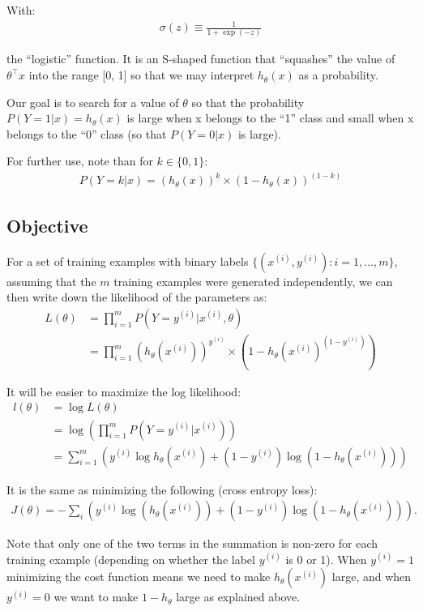 With:
\begin{align}
	\sigma(z) \equiv \frac{1}{1 + \exp(-z)}
\end{align}

the “logistic” function. It is an S-shaped function that “squashes” the value of $\theta^\top x$ into the range [0, 1] so that we may interpret $h_\theta(x)$ as a probability. 

Our goal is to search for a value of $\theta$ so that the probability $P(Y=1|x) = h_\theta(x)$ is large when x belongs to the “1” class and small when x belongs to the “0” class (so that $P(Y=0|x)$ is large). 

For further use, note than for $k \in \{0,1\}$:
\begin{align}
	P(Y=k|x) = (h_\theta(x))^k \times (1 - h_\theta(x))^{(1-k)}
\end{align}

\subsection{Objective}
For a set of training examples with binary labels $\{ (x^{(i)}, y^{(i)}) : i=1,\ldots,m\}$, assuming that the $m$ training examples were generated independently, we can then write down the likelihood of the parameters as:
\begin{align}
	L(\theta) &= \prod_{i=1}^m P(Y=y^{(i)} | x^{(i)}, \theta) \\
			  &= \prod_{i=1}^m (h_\theta(x^{(i)}))^{y^{(i)}} \times (1 - h_\theta(x^{(i)})^{(1-y^{(i)})})
\end{align}

It will be easier to maximize the log likelihood:
\begin{align}
	l(\theta) &= \log L(\theta) \\
			  &= \log \left( \prod_{i=1}^m P(Y=y^{(i)} | x^{(i)}) \right) \\
			  &= \sum_{i=1}^m \left( y^{(i)}\log h_\theta(x^{(i)}) + (1-y^{(i)})\log (1 - h_\theta(x^{(i)})) \right)
\end{align}

It is the same as minimizing the following (cross entropy loss):
\begin{align}
	J(\theta) = - \sum_i \left(y^{(i)} \log( h_\theta(x^{(i)}) ) + (1 - y^{(i)}) \log( 1 - h_\theta(x^{(i)}) ) \right).
\end{align}


Note that only one of the two terms in the summation is non-zero for each training example (depending on whether the label $y^{(i)}$ is 0 or 1). When $y^{(i)} = 1$ minimizing the cost function means we need to make $h_\theta(x^{(i)})$ large, and when $y^{(i)} = 0$ we want to make $1 - h_\theta$ large as explained above.

